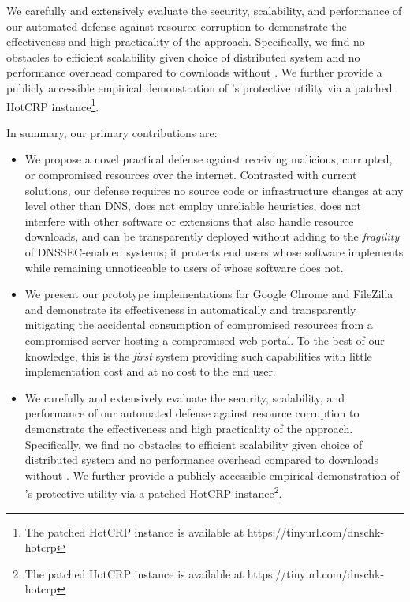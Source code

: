 
We carefully and extensively evaluate the security, scalability, and performance
of our automated defense against resource corruption to demonstrate the
effectiveness and high practicality of the \SYSTEM{} approach. Specifically, we
find no obstacles to efficient scalability given choice of distributed system
and no performance overhead compared to downloads without \SYSTEM{}. We further
provide a publicly accessible empirical demonstration of \SYSTEM{}'s protective
utility via a patched HotCRP instance\footnote{The patched HotCRP instance is
available at https://tinyurl.com/dnschk-hotcrp}.


In summary, our primary contributions are:

\begin{itemize}

  \item We propose a novel practical defense against receiving malicious,
  corrupted, or compromised resources over the internet. Contrasted with current
  solutions, our defense requires no source code or infrastructure changes at
  any level other than DNS, does not employ unreliable heuristics, does not
  interfere with other software or extensions that also handle resource
  downloads, and can be transparently deployed without adding to the
  \textit{fragility} of DNSSEC-enabled systems; it protects end users whose
  software implements \SYSTEM{} while remaining unnoticeable to users of whose
  software does not.

  \item We present our prototype \SYSTEM{} implementations for Google Chrome and
  FileZilla and demonstrate its effectiveness in automatically and transparently
  mitigating the accidental consumption of compromised resources from a
  compromised server hosting a compromised web portal. To the best of our
  knowledge, this is the \emph{first} system providing such capabilities with
  little implementation cost and at no cost to the end user.

  \item We carefully and extensively evaluate the security, scalability, and
  performance of our automated defense against resource corruption to
  demonstrate the effectiveness and high practicality of the \SYSTEM{} approach.
  Specifically, we find no obstacles to efficient scalability given choice of
  distributed system and no performance overhead compared to downloads without
  \SYSTEM{}. We further provide a publicly accessible empirical demonstration of
  \SYSTEM{}'s protective utility via a patched HotCRP instance\footnote{The
  patched HotCRP instance is available at https://tinyurl.com/dnschk-hotcrp}.

\end{itemize}

